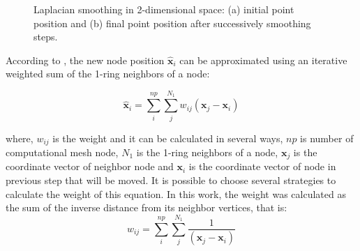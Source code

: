 \begin{figure}[H]
\begin{center}
\end{center}
\caption{Laplacian smoothing in 2-dimensional space: 
(a) initial point position and
(b) final point position after successively smoothing steps.
}
\label{laplacian smoothing space}
\end{figure}




\medskip
According to \cite{zheng1996}, the new node position 
$\hat{\textbf{x}}_{i}$ can be approximated using an 
iterative weighted sum
of the 1-ring neighbors of a node:

\begin{equation}
\hat{\textbf{x}}_{i} 
= \sum_{i}^{np} \sum_{j}^{N_1} w_{ij}
\left( \textbf{x}_{j} - \textbf{x}_{i} \right)
\end{equation}

\medskip
\noindent
where, 
$w_{ij}$ is the weight and it can be calculated in several ways,
$np$ is number of computational mesh node,
$N_{1}$ is the 1-ring neighbors of a node,
$\textbf{x}_{j}$ is the coordinate vector of neighbor node and
$\textbf{x}_{i}$ is the coordinate vector of node in previous step that will be moved.
It is possible to choose several strategies to calculate 
the weight of this equation. In this work, the weight was 
calculated as the sum of the inverse distance from its neighbor vertices,
that is:
\begin{equation}
w_{ij} = \sum_{i}^{np} \sum_{j}^{N_1}
\frac{1}{\left( \textbf{x}_{j} - \textbf{x}_{i} \right)}
\end{equation}


